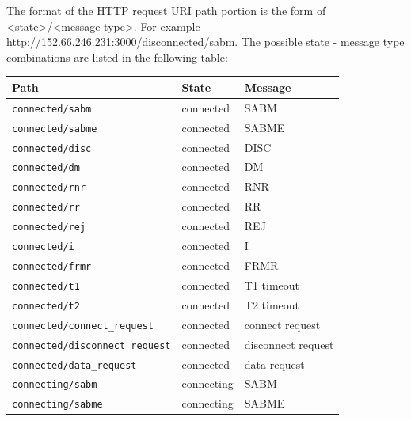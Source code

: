 \documentclass[a4paper]{article}
\begin{document}
The format of the HTTP request URI path portion is the form of \url{<state>/<message type>}. For example
\url{http://152.66.246.231:3000/disconnected/sabm}. The possible state - message type combinations are listed in the
following table:

{\scriptsize
\begin{center}
    \begin{tabular}[h]{|l|l|l|}
        \hline
        Path                        & State         & Message             \\
        \hline
        \verb'connected/sabm' & connected     & SABM                \\
        \hline
        \verb'connected/sabme' & connected     & SABME               \\
        \hline
        \verb'connected/disc' & connected     & DISC                \\
        \hline
        \verb'connected/dm' & connected     & DM                  \\
        \hline
        \verb'connected/rnr' & connected     & RNR                 \\
        \hline
        \verb'connected/rr' & connected     & RR                  \\
        \hline
        \verb'connected/rej' & connected     & REJ                 \\
        \hline
        \verb'connected/i' & connected     & I                   \\
        \hline
        \verb'connected/frmr' & connected     & FRMR                \\
        \hline
        \verb'connected/t1' & connected     & T1 timeout          \\
        \hline
        \verb'connected/t2' & connected     & T2 timeout          \\
        \hline
        \verb'connected/connect_request' & connected     & connect request     \\
        \hline
        \verb'connected/disconnect_request' & connected     & disconnect request  \\
        \hline
        \verb'connected/data_request' & connected     & data request        \\
        \hline
        \verb'connecting/sabm' & connecting    & SABM                \\
        \hline
        \verb'connecting/sabme' & connecting    & SABME               \\
        \hline

\end{tabular}
\end{center}}
\end{document}
